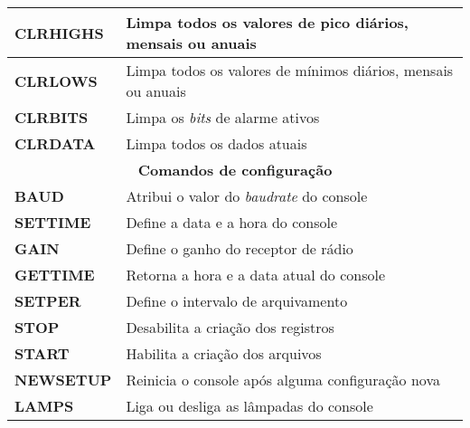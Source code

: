 \begin{anexosenv}
\begin{center}
\begin{longtable}{ll}
\textbf{CLRHIGHS}                   & Limpa todos os valores de pico diários, mensais ou anuais                                   \\ \hline
\textbf{CLRLOWS}                   & Limpa todos os valores de mínimos diários, mensais ou anuais \\ \hline
\textbf{CLRBITS}                   & Limpa os \textit{bits} de alarme ativos                                  \\ \hline
\textbf{CLRDATA}                   & Limpa todos os dados atuais                                   \\ \hline
\multicolumn{2}{c}{\cellcolor{gray!25}\textbf{Comandos de configuração}}                                     		 \\ \hline
\textbf{BAUD}                 & Atribui o valor do \textit{baudrate} do console                                                       \\ \hline
\textbf{SETTIME}                   & Define a data e a hora do console                                   \\ \hline
\textbf{GAIN}                   & Define o ganho do receptor de rádio                                   \\ \hline
\textbf{GETTIME}                   & Retorna a hora e a data atual do console                                   \\ \hline
\textbf{SETPER}                   & Define o intervalo de arquivamento                                   \\ \hline
\textbf{STOP}                   & Desabilita a criação dos registros                                   \\ \hline
\textbf{START}                   & Habilita a criação dos arquivos \\ \hline
\textbf{NEWSETUP}                   & Reinicia o console após alguma configuração nova                                  \\ \hline
\textbf{LAMPS}                   & Liga ou desliga as lâmpadas do console \\ \hline

\end{longtable}
\end{center}


\end{anexosenv}
